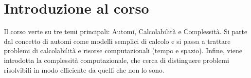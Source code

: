 \chapter*{Introduzione al corso}

Il corso verte su tre temi principali: Automi, Calcolabilità e Complessità. Si parte dal concetto di automi come modelli semplici di calcolo e si passa a trattare problemi di calcolabilità e risorse computazionali (tempo e spazio). Infine, viene introdotta la complessità computazionale, che cerca di distinguere problemi risolvibili in modo efficiente da quelli che non lo sono.